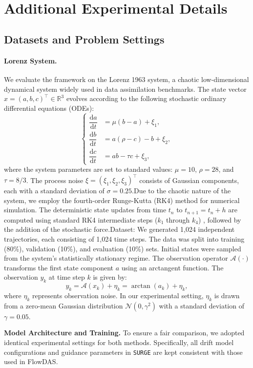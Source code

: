 \documentclass{article}
\newcommand{\dif}{{\mathrm{d}}}
\theoremstyle{plain}
\theoremstyle{definition}
\theoremstyle{remark}
\begin{document}
\section{Additional Experimental Details}
\label{app:exp_details}

\subsection{Datasets and Problem Settings}
\label{app:datasets}

\paragraph{Lorenz System.} 
We evaluate the framework on the Lorenz 1963 system, a chaotic low-dimensional dynamical system widely used in data assimilation benchmarks. The state vector $x=(a,b,c)^\top \in \mathbb{R}^3$ evolves according to the following stochastic ordinary differential equations (ODEs):
$$
\begin{cases}
\dfrac{\dif a}{\dif t} &= \mu(b-a) + \xi_1, \\
\dfrac{\dif b}{\dif t} &= a(\rho-c)-b + \xi_2, \\
\dfrac{\dif c}{\dif t} &= ab-\tau c + \xi_3,
\end{cases}
$$
where the system parameters are set to standard values: $\mu=10$, $\rho=28$, and $\tau=8/3$. The process noise $\xi=(\xi_1, \xi_2, \xi_3)^\top$ consists of Gaussian components, each with a standard deviation of $\sigma=0.25$.Due to the chaotic nature of the system, we employ the fourth-order Runge-Kutta (RK4) method for numerical simulation. The deterministic state updates from time $t_n$ to $t_{n+1}=t_n+h$ are computed using standard RK4 intermediate steps ($k_1$ through $k_4$) , followed by the addition of the stochastic force.Dataset: We generated 1,024 independent trajectories, each consisting of 1,024 time steps. The data was split into training (80\%), validation (10\%), and evaluation (10\%) sets. Initial states were sampled from the system's statistically stationary regime. The observation operator $\mathcal{A}(\cdot)$ transforms the first state component $a$ using an arctangent function. The observation $y_k$ at time step $k$ is given by:$$y_k = \mathcal{A}(x_k) + \eta_k = \arctan(a_k) + \eta_k,$$where $\eta_k$ represents observation noise. In our experimental setting, $\eta_k$ is drawn from a zero-mean Gaussian distribution $\mathcal{N}(0, \gamma^2)$ with a standard deviation of $\gamma=0.05$.

\textbf{Model Architecture and Training.}
To ensure a fair comparison, we adopted identical experimental settings for both methods. Specifically, all drift model configurations and guidance parameters in \texttt{SURGE} are kept consistent with those used in FlowDAS.
\end{document}
